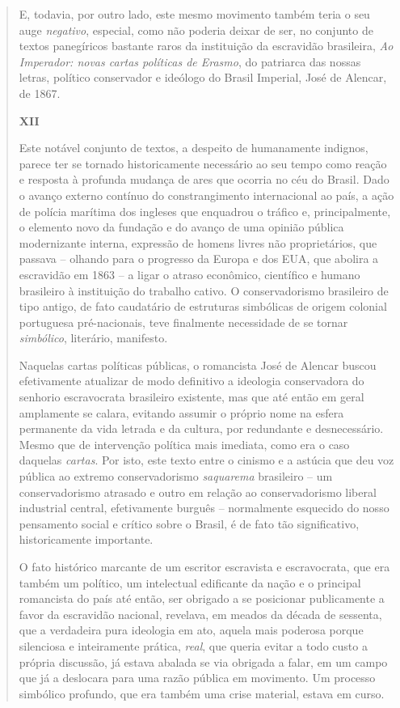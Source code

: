 \begin{quote}
E, todavia, por outro lado, este mesmo movimento também teria o seu auge
\emph{negativo}, especial, como não poderia deixar de ser, no conjunto
de textos panegíricos bastante raros da instituição da escravidão
brasileira, \emph{Ao Imperador: novas cartas políticas de Erasmo}, do
patriarca das nossas letras, político conservador e ideólogo do Brasil
Imperial, José de Alencar, de 1867.

\textbf{XII}

Este notável conjunto de textos, a despeito de humanamente indignos,
parece ter se tornado historicamente necessário ao seu tempo como reação
e resposta à profunda mudança de ares que ocorria no céu do Brasil. Dado
o avanço externo contínuo do constrangimento internacional ao país, a
ação de polícia marítima dos ingleses que enquadrou o tráfico e,
principalmente, o elemento novo da fundação e do avanço de uma opinião
pública modernizante interna, expressão de homens livres não
proprietários, que passava -- olhando para o progresso da Europa e dos
EUA, que abolira a escravidão em 1863 -- a ligar o atraso econômico,
científico e humano brasileiro à instituição do trabalho cativo. O
conservadorismo brasileiro de tipo antigo, de fato caudatário de
estruturas simbólicas de origem colonial portuguesa pré-nacionais, teve
finalmente necessidade de se tornar \emph{simbólico}, literário,
manifesto.

Naquelas cartas políticas públicas, o romancista José de Alencar buscou
efetivamente atualizar de modo definitivo a ideologia conservadora do
senhorio escravocrata brasileiro existente, mas que até então em geral
amplamente se calara, evitando assumir o próprio nome na esfera
permanente da vida letrada e da cultura, por redundante e desnecessário.
Mesmo que de intervenção política mais imediata, como era o caso
daquelas \emph{cartas}. Por isto, este texto entre o cinismo e a astúcia
que deu voz pública ao extremo conservadorismo \emph{saquarema}
brasileiro -- um conservadorismo atrasado e outro em relação ao
conservadorismo liberal industrial central, efetivamente burguês --
normalmente esquecido do nosso pensamento social e crítico sobre o
Brasil, é de fato tão significativo, historicamente importante.

O fato histórico marcante de um escritor escravista e escravocrata, que
era também um político, um intelectual edificante da nação e o principal
romancista do país até então, ser obrigado a se posicionar publicamente
a favor da escravidão nacional, revelava, em meados da década de
sessenta, que a verdadeira pura ideologia em ato, aquela mais poderosa
porque silenciosa e inteiramente prática, \emph{real}, que queria evitar
a todo custo a própria discussão, já estava abalada se via obrigada a
falar, em um campo que já a deslocara para uma razão pública em
movimento. Um processo simbólico profundo, que era também uma crise
material, estava em curso.


\end{quote}
